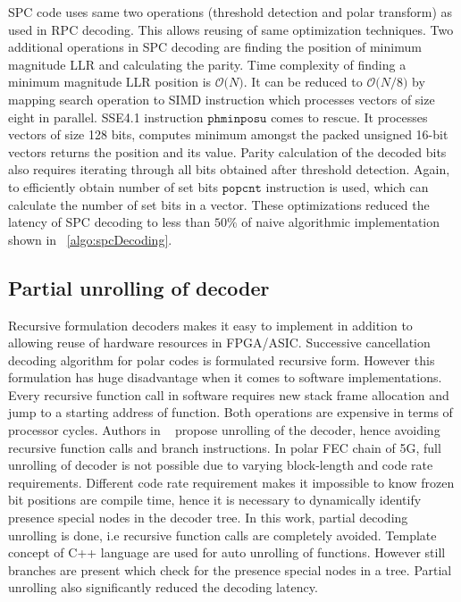 SPC code uses same two operations (threshold detection and polar transform) as used in RPC decoding. This allows reusing of same optimization techniques. Two additional operations in SPC decoding are finding the position of minimum magnitude LLR and calculating the parity. Time complexity of finding a minimum magnitude LLR position is $\mathcal{O}\big(N\big)$. It can be reduced to $\mathcal{O}\big(N/8\big)$ by mapping search operation to SIMD instruction which processes vectors of size eight in parallel. SSE4.1 instruction $\mathtt{phminposu}$ comes to rescue. It processes vectors of size 128 bits, computes minimum amongst the packed unsigned 16-bit vectors returns the position and its value. Parity calculation of the decoded bits also requires iterating through all bits obtained after threshold detection. Again, to efficiently obtain number of set bits $\mathtt{popcnt}$ instruction is used, which can calculate the number of set bits in a vector. These optimizations reduced the latency of SPC decoding to less than $50\%$ of naive algorithmic implementation shown in ~\ref{algo:spcDecoding}.

\subsection{Partial unrolling of decoder}
Recursive formulation decoders makes it easy to implement in addition to allowing reuse of hardware resources in FPGA/ASIC. Successive cancellation decoding algorithm for polar codes is formulated recursive form. However this formulation has huge disadvantage when it comes to software implementations. Every recursive function call in software requires new stack frame allocation and jump to a starting address of function. Both operations are expensive in terms of processor cycles. Authors in ~\cite{fastPolarDecodersAlgoImpl} propose unrolling of the decoder, hence avoiding recursive function calls and branch instructions. In polar FEC chain of 5G, full unrolling of decoder is not possible due to varying block-length and code rate requirements. Different code rate requirement makes it impossible to know frozen bit positions are compile time, hence it is necessary to dynamically identify presence special nodes in the decoder tree. In this work, partial decoding unrolling is done, i.e recursive function calls are completely avoided. Template concept of C++ language are used for auto unrolling of functions. However still branches are present which check for the presence special nodes in a tree. Partial unrolling also significantly reduced the decoding latency.

